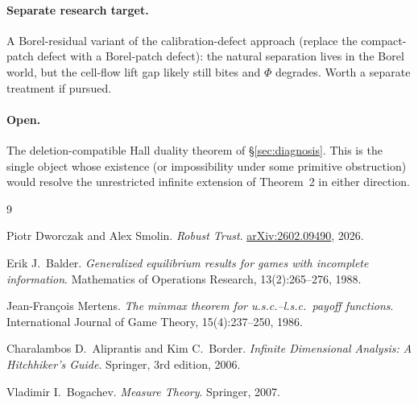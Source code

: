 \documentclass[11pt]{article}
\theoremstyle{definition}
\theoremstyle{remark}
\begin{document}
\paragraph{Separate research target.}
A Borel-residual variant of the calibration-defect approach
(replace the compact-patch defect with a Borel-patch defect): the
natural separation lives in the Borel world, but the cell-flow lift
gap likely still bites and $\Phi$ degrades. Worth a separate
treatment if pursued.

\paragraph{Open.}
The deletion-compatible Hall duality theorem of \S\ref{sec:diagnosis}.
This is the single object whose existence (or impossibility under
some primitive obstruction) would resolve the unrestricted infinite
extension of Theorem~2 in either direction.

\begin{thebibliography}{9}

Piotr Dworczak and Alex Smolin.
\emph{Robust Trust}.
\href{https://arxiv.org/abs/2602.09490}{arXiv:2602.09490}, 2026.

Erik J.\ Balder.
\emph{Generalized equilibrium results for games with incomplete information}.
Mathematics of Operations Research, 13(2):265--276, 1988.

Jean-François Mertens.
\emph{The minmax theorem for u.s.c.--l.s.c.\ payoff functions}.
International Journal of Game Theory, 15(4):237--250, 1986.

Charalambos D.\ Aliprantis and Kim C.\ Border.
\emph{Infinite Dimensional Analysis: A Hitchhiker's Guide}.
Springer, 3rd edition, 2006.

Vladimir I.\ Bogachev.
\emph{Measure Theory}.
Springer, 2007.

\end{thebibliography}
\end{document}
